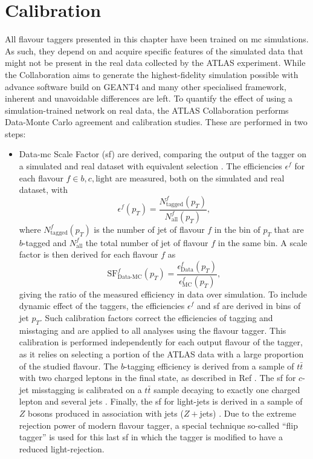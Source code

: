 \section{Calibration}
All flavour taggers presented in this chapter have been trained on \gls{mc} simulations. As such, they depend on and acquire specific features of the simulated data that might not be present in the real data collected by the ATLAS experiment. While the Collaboration aims to generate the highest-fidelity simulation possible with advance software build on GEANT4 \cite{Agostinelli:602040} and many other specialised framework, inherent and unavoidable differences are left. To quantify the effect of using a simulation-trained network on real data, the ATLAS Collaboration performs Data-Monte Carlo agreement and calibration studies. These are performed in two steps: 
\begin{itemize}
  \item Data-\gls{mc} Scale Factor (\gls{sf}) are derived, comparing the output of the tagger on a simulated and real dataset with equivalent selection \cite{Aad:2019aic, ATLAS-CONF-2018-045, ATLAS-CONF-2018-006, cjettaggingCalib}. The efficiencies $\epsilon^f$ for each flavour $f \in {b, c, \textrm{light}}$ are measured, both on the simulated and real dataset, with \[\epsilon^f(p_T) = \frac{N^f_{\textrm{tagged}}(p_T)}{N^f_{\textrm{all}}(p_T)},\] where $N^f_{\textrm{tagged}}(p_T)$ is the number of jet of flavour $f$ in the bin of $p_T$ that are $b$-tagged and $N^f_{\textrm{all}}$ the total number of jet of flavour $f$ in the same bin. A scale factor is then derived for each flavour $f$ as \[\textrm{SF}^f_{\textrm{Data-MC}}(p_T) = \frac{\epsilon^f_{\textrm{Data}}(p_T)}{\epsilon^f_{\textrm{MC}}(p_T)},\] giving the ratio of the measured efficiency in data over simulation. To include dynamic effect of the taggers, the efficiencies $\epsilon^f$ and \gls{sf} are derived in bins of jet $p_T$. Such calibration factors correct the efficiencies of tagging and misstaging and are applied to all analyses using the flavour tagger. This calibration is performed independently for each output flavour of the tagger, as it relies on selecting a portion of the ATLAS data with a large proportion of the studied flavour. The $b$-tagging efficiency is derived from a sample of $t\bar{t}$ with two charged leptons in the final state, as described in Ref \cite{Aad:2019aic}. The \gls{sf} for $c$-jet misstagging is calibrated on a $t\bar{t}$ sample decaying to exactly one charged lepton and several jets \cite{cjettaggingCalib}. Finally, the \gls{sf} for light-jets is derived in a sample of $Z$ bosons produced in association with jets ($Z+$jets) \cite{ATLAS:2023lwk}. Due to the extreme rejection power of modern flavour tagger, a special technique so-called ``flip tagger'' is used for this last \gls{sf} in which the tagger is modified to have a reduced light-rejection.

\end{itemize}
